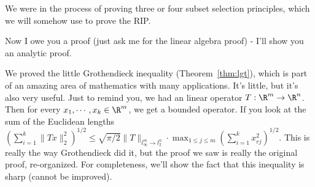
We were in the process of proving three or four subset selection principles, which we will somehow use to prove the RIP. 

Now I owe you a proof (just ask me for the linear algebra proof) - I'll show you an analytic proof. 

We proved the little Grothendieck inequality (Theorem~\ref{thm:lgt}), which is part of an amazing area of mathematics with many applications. It's little, but it's also very useful. Just to remind you, we had an linear operator $T: \R^m \to \R^n$. Then for every $x_1, \cdots, x_k \in \R^m$, we get a bounded operator. If you look at the sum of the Euclidean lengths $\left(\sum_{i = 1}^k \|Tx\|_2^2\right)^{1/2} \leq \sqrt{\pi/2}\|T\|_{l_{\infty}^m \to l_2^n} \cdot \max_{1 \leq j \leq m} \left(\sum_{i = 1}^k x_{rj}^2\right)^{1/2}$. This is really the way Grothendieck did it, but the proof we saw is really the original proof, re-organized. For completeness, we'll show the fact that this inequality is sharp (cannot be improved). 

